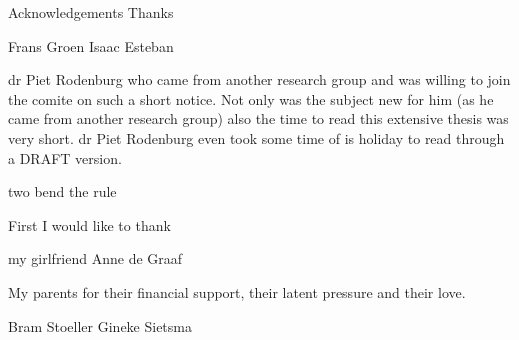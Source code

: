 {\huge Acknowledgements}
Thanks

Frans Groen
Isaac Esteban


dr Piet Rodenburg who came from another research group and was willing to join
the comite on such a short notice.  Not only was the subject new for him (as he
came from another research group) also the time to read this extensive thesis
was very short.  dr Piet Rodenburg even took some time of is holiday to read through
a DRAFT version.

two bend the rule 


First 
I would like to thank

my girlfriend Anne de Graaf


My parents for their financial support, their latent pressure and their love.


Bram Stoeller
Gineke Sietsma
